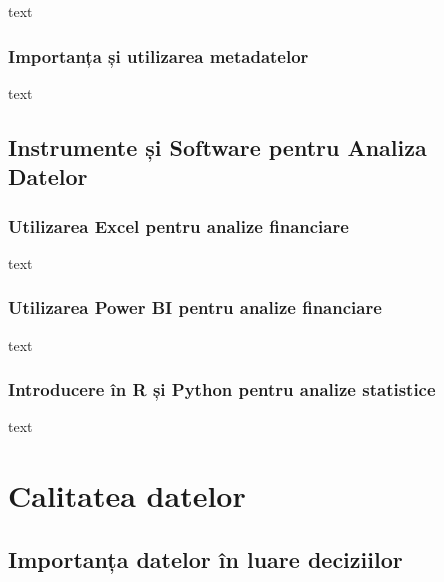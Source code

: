 \documentclass[
  11pt,
  b5paper,
  nottoc]{book}
\begin{document}
text

\hypertarget{importanux21ba-ux219i-utilizarea-metadatelor-5}{%
\subsection{Importanța și utilizarea
metadatelor}\label{importanux21ba-ux219i-utilizarea-metadatelor-5}}

text

\hypertarget{instrumente-ux219i-software-pentru-analiza-datelor-5}{%
\section{Instrumente și Software pentru Analiza
Datelor}\label{instrumente-ux219i-software-pentru-analiza-datelor-5}}

\hypertarget{utilizarea-excel-pentru-analize-financiare-5}{%
\subsection{Utilizarea Excel pentru analize
financiare}\label{utilizarea-excel-pentru-analize-financiare-5}}

text

\hypertarget{utilizarea-power-bi-pentru-analize-financiare-5}{%
\subsection{Utilizarea Power BI pentru analize
financiare}\label{utilizarea-power-bi-pentru-analize-financiare-5}}

text

\hypertarget{introducere-uxeen-r-ux219i-python-pentru-analize-statistice-5}{%
\subsection{Introducere în R și Python pentru analize
statistice}\label{introducere-uxeen-r-ux219i-python-pentru-analize-statistice-5}}

text


\hypertarget{cap7}{%
\chapter{Calitatea datelor}\label{cap7}}

\hypertarget{importanux21ba-datelor-uxeen-luare-deciziilor-6}{%
\section{Importanța datelor în luare
deciziilor}\label{importanux21ba-datelor-uxeen-luare-deciziilor-6}}
\end{document}
